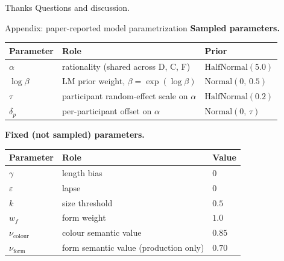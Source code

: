 \documentclass[10pt,aspectratio=169]{beamer}
\newcommand{\main}[1]{\textcolor{CSP-main-dark}{\textbf{#1}}}
\begin{document}
\begin{frame}{Thanks}
\centering
\vspace{2em}
\Large Questions and discussion.

\vspace{2em}
\normalsize
\end{frame}

\begin{frame}{Appendix: paper-reported model parametrization}
\small
\main{Sampled parameters.}
\begin{center}\footnotesize
\begin{tabular}{lll}
\toprule
Parameter & Role & Prior \\
\midrule
$\alpha$      & rationality (shared across D, C, F)           & $\mathrm{HalfNormal}(5.0)$ \\
$\log\beta$   & LM prior weight, $\beta = \exp(\log\beta)$    & $\mathrm{Normal}(0,\, 0.5)$ \\
$\tau$        & participant random-effect scale on $\alpha$   & $\mathrm{HalfNormal}(0.2)$ \\
$\delta_p$    & per-participant offset on $\alpha$            & $\mathrm{Normal}(0,\, \tau)$ \\
\bottomrule
\end{tabular}
\end{center}

\vspace{0.5em}
\main{Fixed (not sampled) parameters.}
\begin{center}\footnotesize
\begin{tabular}{lll}
\toprule
Parameter & Role & Value \\
\midrule
$\gamma$            & length bias                              & $0$ \\
$\varepsilon$       & lapse                                    & $0$ \\
$k$                 & size threshold                           & $0.5$ \\
$w_f$               & form weight                              & $1.0$ \\
$\nu_\text{colour}$ & colour semantic value                    & $0.85$ \\
$\nu_\text{form}$   & form semantic value (production only)    & $0.70$ \\
\bottomrule
\end{tabular}
\end{center}


\end{frame}
\end{document}
